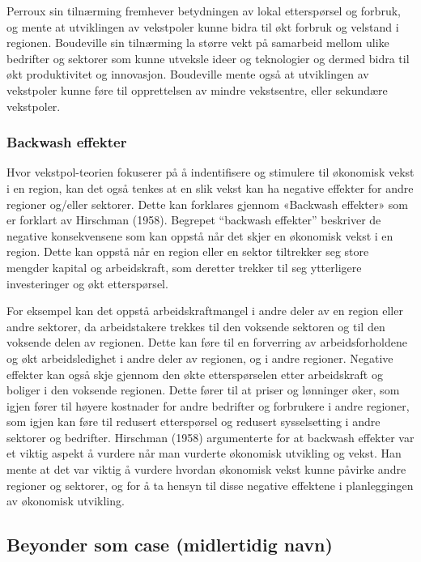 \documentclass[
]{article}
\begin{document}
Perroux sin tilnærming fremhever betydningen av lokal etterspørsel og
forbruk, og mente at utviklingen av vekstpoler kunne bidra til økt
forbruk og velstand i regionen. Boudeville sin tilnærming la større vekt
på samarbeid mellom ulike bedrifter og sektorer som kunne utveksle ideer
og teknologier og dermed bidra til økt produktivitet og innovasjon.
Boudeville mente også at utviklingen av vekstpoler kunne føre til
opprettelsen av mindre vekstsentre, eller sekundære vekstpoler.

\hypertarget{backwash-effekter}{%
\subsubsection{Backwash effekter}\label{backwash-effekter}}

Hvor vekstpol-teorien fokuserer på å indentifisere og stimulere til
økonomisk vekst i en region, kan det også tenkes at en slik vekst kan ha
negative effekter for andre regioner og/eller sektorer. Dette kan
forklares gjennom «Backwash effekter» som er forklart av Hirschman
(1958). Begrepet ``backwash effekter'' beskriver de negative
konsekvensene som kan oppstå når det skjer en økonomisk vekst i en
region. Dette kan oppstå når en region eller en sektor tiltrekker seg
store mengder kapital og arbeidskraft, som deretter trekker til seg
ytterligere investeringer og økt etterspørsel.

For eksempel kan det oppstå arbeidskraftmangel i andre deler av en
region eller andre sektorer, da arbeidstakere trekkes til den voksende
sektoren og til den voksende delen av regionen. Dette kan føre til en
forverring av arbeidsforholdene og økt arbeidsledighet i andre deler av
regionen, og i andre regioner. Negative effekter kan også skje gjennom
den økte etterspørselen etter arbeidskraft og boliger i den voksende
regionen. Dette fører til at priser og lønninger øker, som igjen fører
til høyere kostnader for andre bedrifter og forbrukere i andre regioner,
som igjen kan føre til redusert etterspørsel og redusert sysselsetting i
andre sektorer og bedrifter. Hirschman (1958) argumenterte for at
backwash effekter var et viktig aspekt å vurdere når man vurderte
økonomisk utvikling og vekst. Han mente at det var viktig å vurdere
hvordan økonomisk vekst kunne påvirke andre regioner og sektorer, og for
å ta hensyn til disse negative effektene i planleggingen av økonomisk
utvikling.

\hypertarget{beyonder-som-case-midlertidig-navn}{%
\subsection{Beyonder som case (midlertidig
navn)}\label{beyonder-som-case-midlertidig-navn}}
\end{document}

